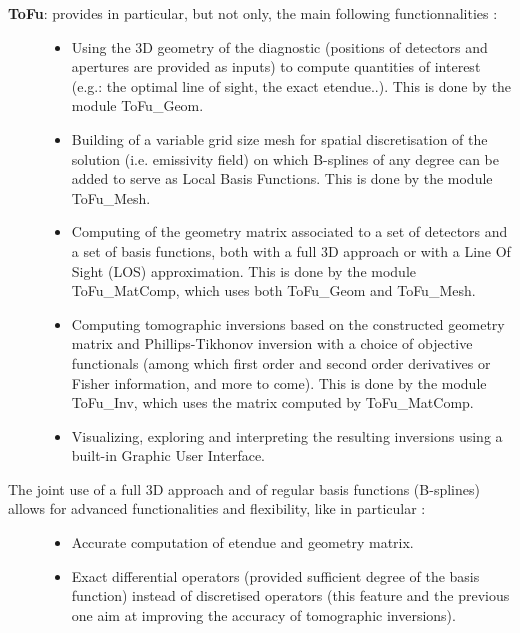 \documentclass[letterpaper,10pt,english]{sphinxmanual}
\begin{document}
\begin{description}
\item[{\textbf{ToFu}: provides in particular, but not only, the main following functionnalities :}] \leavevmode\begin{itemize}
\item {} 
Using the 3D geometry of the diagnostic (positions of detectors and apertures are provided as inputs) to compute quantities of interest (e.g.: the optimal line of sight, the exact etendue..). This is done by the module ToFu\_Geom.

\item {} 
Building of a variable grid size mesh for spatial discretisation of the solution (i.e. emissivity field) on which B-splines of any degree can be added to serve as Local Basis Functions. This is done by the module ToFu\_Mesh.

\item {} 
Computing of the geometry matrix associated to a set of detectors and a set of basis functions, both with a full 3D approach or with a Line Of Sight (LOS) approximation. This is done by the module ToFu\_MatComp, which uses both ToFu\_Geom and ToFu\_Mesh.

\item {} 
Computing tomographic inversions based on the constructed geometry matrix and Phillips-Tikhonov inversion with a choice of objective functionals (among which first order and second order derivatives or Fisher information, and more to come). This is done by the module ToFu\_Inv, which uses the matrix computed by ToFu\_MatComp.

\item {} 
Visualizing, exploring and interpreting the resulting inversions using a built-in Graphic User Interface.

\end{itemize}

\item[{The joint use of a full 3D approach and of regular basis functions (B-splines) allows for advanced functionalities and flexibility, like in particular :}] \leavevmode\begin{itemize}
\item {} 
Accurate computation of etendue and geometry matrix.

\item {} 
Exact differential operators (provided sufficient degree of the basis function) instead of discretised operators (this feature and the previous one aim at improving the accuracy of tomographic inversions).


\end{itemize}
\end{description}
\end{document}
